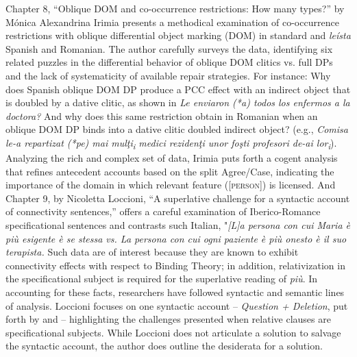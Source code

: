\documentclass[output=paper,draftmode]{langscibook}
\begin{document}
Chapter 8, “Oblique DOM and co-occurrence restrictions: How many types?” by Mónica Alexandrina Irimia presents a methodical examination of co-occur\-rence restrictions with oblique differential object marking (DOM) in standard and \textit{leísta} Spanish and Romanian. The author carefully surveys the data, identifying six related puzzles in the differential behavior of oblique DOM clitics vs. full DPs and the lack of systematicity of available repair strategies. For instance: Why does Spanish oblique DOM DP produce a PCC effect with an indirect object that is doubled by a dative clitic, as shown in \textit{Le enviaron (*a) todos los enfermos a la doctora?} And why does this same restriction obtain in Romanian when an oblique DOM DP binds into a dative clitic doubled indirect object? (e.g., \textit{Comisa le-a repartizat (*pe) mai mul\c{t}i\textsubscript{i} medici reziden\c{t}i unor fo\c{s}ti profesori de-ai lor\textsubscript{i}}). Analyzing the rich and complex set of data, Irimia puts forth a cogent analysis that refines antecedent accounts based on the split Agree/Case, indicating the importance of the domain in which relevant feature ([\textsc{person}]) is licensed. And Chapter 9, by Nicoletta Loccioni, “A superlative challenge for a syntactic account of connectivity sentences,” offers a careful examination of Iberico-Romance specificational sentences and contrasts such Italian,  "\textit{[L]a persona con cui Maria è più esigente è se stessa vs.  La persona con cui ogni paziente è più onesto è il suo terapista.}  Such data are of interest because they are known to exhibit connectivity effects with respect to Binding Theory; in addition, relativization in the specificational subject is required for the superlative reading of \textit{più}. In accounting for these facts, researchers have followed syntactic and semantic lines of analysis. Loccioni focuses on one syntactic account -- \textit{Question + Deletion}, put forth by \citet{schlenker2003clausalequation} and \citet{romero2007connectivityunified, romero2018connectivity} -- highlighting the challenges presented when relative clauses are specificational subjects. While Loccioni does not articulate a solution to salvage the syntactic account, the author does outline the desiderata for a solution.
\end{document}
